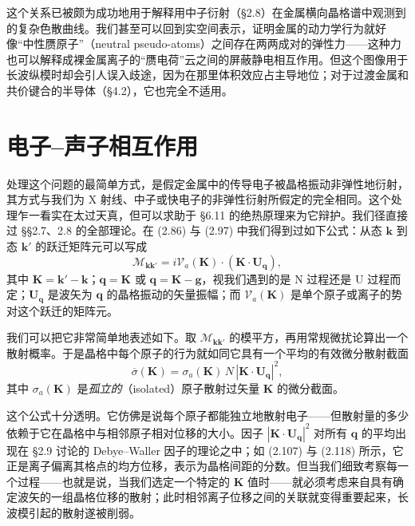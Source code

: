 这个关系已被颇为成功地用于解释用中子衍射（§2.8）在金属横向晶格谱中观测到的复杂色散曲线。我们甚至可以回到实空间表示，证明金属的动力学行为就好像“中性赝原子”（neutral pseudo-atoms）之间存在两两成对的弹性力——这种力也可以解释成裸金属离子的“赝电荷”云之间的屏蔽静电相互作用。但这个图像用于长波纵模时却会引人误入歧途，因为在那里体积效应占主导地位；对于过渡金属和共价键合的半导体（§4.2），它也完全不适用。

\section{电子–声子相互作用}

处理这个问题的最简单方式，是假定金属中的传导电子被晶格振动非弹性地衍射，其方式与我们为 X 射线、中子或快电子的非弹性衍射所假定的完全相同。这个处理乍一看实在太过天真，但可以求助于 §6.11 的绝热原理来为它辩护。我们径直接过 §§2.7、2.8 的全部理论。在 (2.86) 与 (2.97) 中我们得到过如下公式：从态 $\mathbf{k}$ 到态 $\mathbf{k}'$ 的跃迁矩阵元可以写成
\begin{equation*}
\mathcal{M}_{\mathbf{k}\mathbf{k}'} = i\mathcal{V}_{a}(\mathbf{K})\cdot(\mathbf{K}\cdot\mathbf{U}_{\mathbf{q}}), \tag{6.86}
\end{equation*}
其中 $\mathbf{K} = \mathbf{k}' - \mathbf{k}$；$\mathbf{q} = \mathbf{K}$ 或 $\mathbf{q} = \mathbf{K} - \mathbf{g}$，视我们遇到的是 N 过程还是 U 过程而定；$\mathbf{U}_{\mathbf{q}}$ 是波矢为 $\mathbf{q}$ 的晶格振动的矢量振幅；而 $\mathcal{V}_{a}(\mathbf{K})$ 是单个原子或离子的势对这个跃迁的矩阵元。

我们可以把它非常简单地表述如下。取 $\mathcal{M}_{\mathbf{k}\mathbf{k}'}$ 的模平方，再用常规微扰论算出一个散射概率。于是晶格中每个原子的行为就如同它具有一个平均的有效微分散射截面
\begin{equation*}
\overline{\sigma}(\mathbf{K}) = \sigma_{a}(\mathbf{K})\,N\,|\mathbf{K}\cdot\mathbf{U}_{\mathbf{q}}|^{2}, \tag{6.87}
\end{equation*}
其中 $\sigma_{a}(\mathbf{K})$ 是\emph{孤立的}（isolated）原子散射过矢量 $\mathbf{K}$ 的微分截面。

这个公式十分透明。它仿佛是说每个原子都能独立地散射电子——但散射量的多少依赖于它在晶格中与相邻原子相对位移的大小。因子 $|\mathbf{K}\cdot\mathbf{U}_{\mathbf{q}}|^{2}$ 对所有 $\mathbf{q}$ 的平均出现在 §2.9 讨论的 Debye--Waller 因子的理论之中；如 (2.107) 与 (2.118) 所示，它正是离子偏离其格点的均方位移，表示为晶格间距的分数。但当我们细致考察每一个过程——也就是说，当我们选定一个特定的 $\mathbf{K}$ 值时——就必须考虑来自具有确定波矢的一组晶格位移的散射；此时相邻离子位移之间的关联就变得重要起来，长波模引起的散射遂被削弱。

